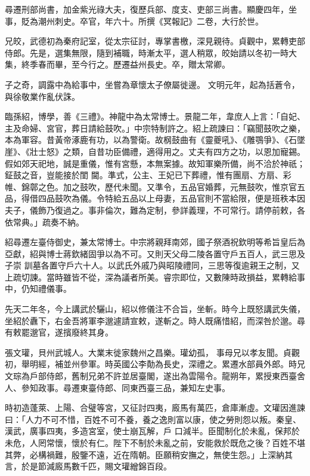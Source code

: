 \begin{pinyinscope}
 尋遷刑部尚書，加金紫光祿大夫，復歷兵部、度支、吏部三尚書。顯慶四年，坐事，貶為潮州刺史。卒官，年六十。所撰《冥報記》二卷，大行於世。



 兄皎，武德初為秦府記室，從太宗征討，專掌書檄，深見親待。貞觀中，累轉吏部侍郎。先是，選集無限，隨到補職，時漸太平，選人稍眾，皎始請以冬初一時大集，終季春而畢，至今行之。歷遷益州長史。卒，贈太常卿。



 子之奇，調露中為給事中，坐嘗為章懷太子僚屬徙邊。
 文明元年，起為括蒼令，與徐敬業作亂伏誅。



 臨孫紹，博學，善《三禮》。神龍中為太常博士。景龍二年，韋庶人上言：「自妃、主及命婦、宮官，葬日請給鼓吹。」中宗特制許之。紹上疏諫曰：「竊聞鼓吹之樂，本為軍容。昔黃帝涿鹿有功，以為警衛。故㭎鼓曲有《靈夔吼》、《雕鶚爭》、《石墜崖》、《壯士怒》之類，自昔功臣備禮，適得用之。丈夫有四方之功，以恩加寵錫。假如郊天祀地，誠是重儀，惟有宮懸，本無案據。故知軍樂所備，尚不洽於神祇；鉦鼓之音，豈能接於閨
 閫。準式，公主、王妃已下葬禮，惟有團扇、方扇、彩帷、錦鄣之色。加之鼓吹，歷代未聞。又準令，五品官婚葬，元無鼓吹，惟京官五品，得借四品鼓吹為儀。令特給五品以上母妻，五品官則不當給限，便是班秩本因夫子，儀飾乃復過之。事非倫次，難為定制，參詳義理，不可常行。請停前敕，各依常典。」疏奏不納。



 紹尋遷左臺侍御史，兼太常博士。中宗將親拜南郊，國子祭酒祝欽明等希旨皇后為亞獻，紹與博士蔣欽緒固爭以為不可。又則天父母二陵各置守戶五百人，武三思及子崇
 訓墓各置守戶六十人。以武氏外戚乃與昭陵禮同，三思等復逾親王之制，又上疏切諫。當時雖皆不從，深為議者所美。睿宗即位，又數陳時政損益，累轉給事中，仍知禮儀事。



 先天二年冬，今上講武於驪山，紹以修儀注不合旨，坐斬。時今上既怒講武失儀，坐紹於纛下，右金吾將軍李邈遽請宣敕，遂斬之。時人既痛惜紹，而深咎於邈。尋有敕罷邈官，遂擯廢終其身。



 張文瓘，貝州武城人。大業末徙家魏州之昌樂。瓘幼孤，
 事母兄以孝友聞。貞觀初，舉明經，補並州參軍。時英國公李勣為長史，深禮之。累遷水部員外郎。時兄文琮為戶部侍郎，舊制兄弟不許並居臺閣，遂出為雲陽令。龍朔年，累授東西臺舍人、參知政事。尋遷東臺侍郎、同東西臺三品，兼知左史事。



 時初造蓬萊、上陽、合璧等宮，又征討四夷，廄馬有萬匹，倉庫漸虛。文瓘因進諫曰：「人力不可不惜，百姓不可不養，養之逸則富以康，使之勞則怨以叛。秦皇、漢武，廣事四夷，多造宮室，使士崩瓦解，戶
 口減半。臣聞制化於未亂，保邦於未危，人罔常懷，懷於有仁。陛下不制於未亂之前，安能救於既危之後？百姓不堪其弊，必構禍難，殷鑒不遠，近在隋朝。臣願稍安撫之，無使生怨。」上深納其言，於是節減廄馬數千匹，賜文瓘繒錦百段。




\end{pinyinscope}
